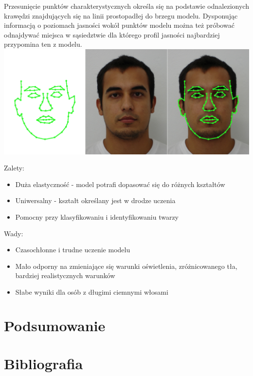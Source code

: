 \documentclass[11pt,a4paper]{article}
\begin{document}
Przesunięcie punktów charakterystycznych określa się na podstawie odnalezionych krawędzi znajdujących się na linii prostopadłej do brzegu modelu. Dysponując informacją o poziomach jasności wokół punktów modelu można też próbować odnajdywać miejsca w sąsiedztwie dla którego profil jasności najbardziej przypomina ten z modelu. \\

\vspace*{1cm}
\includegraphics[scale=0.40]{active_shape.png}
\vspace*{1cm}

\noindent 
Zalety:
\begin{itemize}
\item Duża elastyczność - model potrafi dopasować się do różnych kształtów
\item Uniwersalny - kształt określany jest w drodze uczenia
\item Pomocny przy klasyfikowaniu i identyfikowaniu twarzy
\end{itemize}

\noindent 
Wady:
\begin{itemize}
\item  Czasochłonne i trudne uczenie modelu 
\item  Mało odporny na zmieniające się warunki oświetlenia, zróżnicowanego tła, bardziej realistycznych warunków
\item  Słabe wyniki dla osób z długimi ciemnymi włosami
\end{itemize}

\section{Podsumowanie}

\section{Bibliografia}


\end{document}
